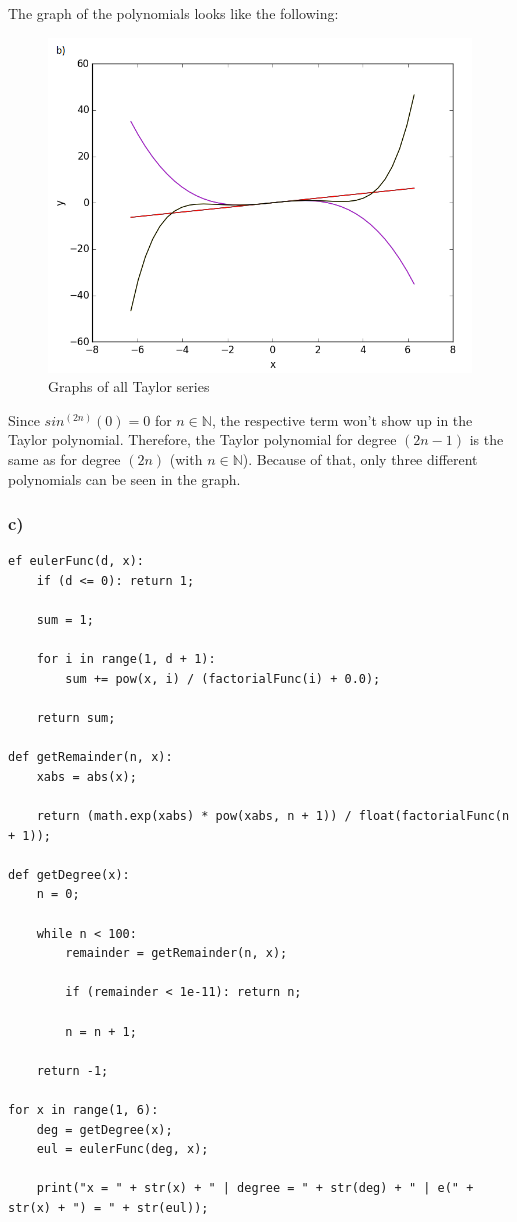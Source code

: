 The graph of the polynomials looks like the following:

\begin{figure}[!ht]
\includegraphics[width=1\textwidth]{chapters/images/figure-2-4-b}
\caption{Graphs of all Taylor series}
\end{figure}

Since $sin^{(2n)}(0) = 0$ for $n \in \mathbb{N}$, the respective term won't show up in the Taylor polynomial. Therefore, the Taylor polynomial for degree $(2n - 1)$ is the same as for degree $(2n)$ (with $n \in \mathbb{N}$). Because of that, only three different polynomials can be seen in the graph.

\subsubsection{c)}

\begin{lstlisting}[caption=Problem 2.4 c)]
ef eulerFunc(d, x):
	if (d <= 0): return 1;

	sum = 1;
	
	for i in range(1, d + 1):
		sum += pow(x, i) / (factorialFunc(i) + 0.0);
	
	return sum;

def getRemainder(n, x):
	xabs = abs(x);
	
	return (math.exp(xabs) * pow(xabs, n + 1)) / float(factorialFunc(n + 1));

def getDegree(x):
	n = 0;
	
	while n < 100:
		remainder = getRemainder(n, x);
		
		if (remainder < 1e-11): return n;
		
		n = n + 1;
		
	return -1;

for x in range(1, 6):
	deg = getDegree(x);
	eul = eulerFunc(deg, x);
	
	print("x = " + str(x) + " | degree = " + str(deg) + " | e(" + str(x) + ") = " + str(eul));
\end{lstlisting}


